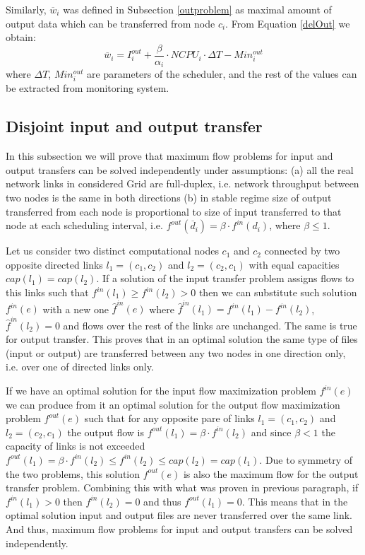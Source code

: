 \documentclass[english]{ddny}
\begin{document}
Similarly, $\overline{w}_{i}$ was defined in Subsection \ref{outproblem} as maximal amount of output data which can be transferred from node $c_{i}$. From Equation \ref{delOut} we obtain:
\begin{equation}
\label{sigma}
\overline{w}_{i} = I_{i}^{out} + \frac{\beta}{\alpha_{i}} \cdot NCPU_{i} \cdot \Delta T - Min_{i}^{out}
\end{equation}  
where $\Delta T$,  $Min_{i}^{out}$ are parameters of the scheduler, and the rest of the values can be extracted from monitoring system.

\subsection{Disjoint input and output transfer}
In this subsection we will prove that maximum flow problems for input and output transfers can be solved independently under assumptions: (a) all the real network links in considered Grid are full-duplex, i.e. network throughput between two nodes is the same in both directions (b) in stable regime size of output transferred from each node is proportional to size of input transferred to that node at each scheduling interval, i.e. $f^{out}(\overline{d}_{i})= \beta \cdot f^{in}(d_{i})$, where $\beta \leq 1$.

Let us consider two distinct computational nodes $c_{1}$ and $c_{2}$ connected by two opposite directed links $l_{1}=(c_{1},c_{2})$ and $l_{2}=(c_{2},c_{1})$ with equal capacities $cap(l_{1})=cap(l_{2})$. If a solution of the input transfer problem assigns flows to this links such that $f^{in}(l_{1}) \geq f^{in}(l_{2}) > 0$ then we can substitute such solution $f^{in}(e)$ with a new one $\widehat{f}^{in}(e)$ where $\widehat{f}^{in}(l_{1}) = f^{in}(l_{1}) - f^{in}(l_{2})$, $\widehat{f}^{in}(l_{2}) = 0$ and flows over the rest of the links are unchanged. The same is true for output transfer. This proves that in an optimal solution the same type of files (input or output) are transferred between any two nodes in one direction only, i.e. over one of directed links only. 

If we have an optimal solution for the input flow maximization problem $f^{in}(e)$ we can produce from it an optimal solution for the output flow maximization problem $f^{out}(e)$ such that for any opposite pare of links $l_{1}=(c_{1},c_{2})$ and $l_{2}=(c_{2},c_{1})$ the output flow is $f^{out}({l_{1}}) = \beta \cdot f^{in}({l_{2}})$ and since $\beta < 1$ the capacity of links is not exceeded  $f^{out}({l_{1}}) =\beta \cdot f^{in}(l_{2}) \leq f^{in}(l_{2}) \leq cap(l_{2}) = cap(l_{1})$. Due to symmetry of the two problems, this solution  $f^{out}(e)$ is also the maximum flow for the output transfer problem. Combining this with what was proven in previous paragraph, if $f^{in}({l_{1}}) > 0$ then $f^{in}({l_{2}}) = 0$ and thus $f^{out}({l_{1}}) = 0$. This means that in the optimal solution input and output files are never transferred over the same link. And thus, maximum flow problems for input and output transfers can be solved independently. 
\end{document}
